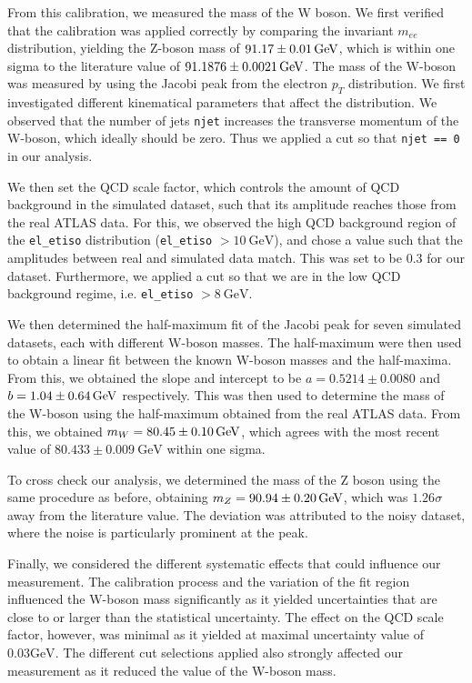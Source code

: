 \documentclass[a4paper]{report}
\numberwithin{equation}{section}
\begin{document}
From this calibration, we measured the mass of the W boson. We first verified that the calibration was applied correctly by 
comparing the invariant $m_{ee}$ distribution, yielding the Z-boson mass of $\SI{91.17 \pm 0.01}{\giga\electronvolt}$, which 
is within one sigma to the literature value of $\SI{91.1876 \pm 0.0021}{\giga\electronvolt}$. The mass of the W-boson was measured by using the Jacobi peak from the 
electron $p_T$ distribution. We first investigated different kinematical parameters that affect the distribution. We observed 
that the number of jets \texttt{njet} increases the transverse momentum of the W-boson, which ideally should be zero. Thus we 
applied a cut so that \texttt{njet == 0} in our analysis.

We then set the QCD scale factor, which controls the amount of QCD background in the simulated 
dataset, such that its amplitude reaches those from the real ATLAS data. For this, we observed the high QCD background 
region of the \texttt{el\_etiso} distribution (\texttt{el\_etiso} $> \SI{10}{\giga\electronvolt}$), and chose a value such that 
the amplitudes between real and simulated data match. This was set to be 0.3 for our dataset. Furthermore, we applied a cut 
so that we are in the low QCD background regime, i.e. \texttt{el\_etiso} $> \SI{8}{\giga\electronvolt}$. \par 

We then determined the half-maximum fit of the Jacobi peak for seven simulated datasets, each with different W-boson masses. 
The half-maximum were then used to obtain a linear fit between the known W-boson masses and the half-maxima. From this, we obtained 
the slope and intercept to be $a = 0.5214 \pm 0.0080$ and $b = \SI{1.04 \pm 0.64}{\giga\electronvolt}$ respectively. This was then 
used to determine the mass of the W-boson using the half-maximum obtained from the real ATLAS data. From this, we obtained 
$m_W = \SI{80.45 \pm 0.10}{\giga\electronvolt}$, which agrees with the most recent value of $80.433 \pm 0.009 \ \text{GeV}$ 
within one sigma. \par 

To cross check our analysis, we determined the mass of the Z boson using the same procedure as before, obtaining 
$m_Z = \SI{90.94 \pm 0.20}{\giga\electronvolt}$, which was $1.26\sigma$ away from the literature value. The deviation was attributed 
to the noisy dataset, where the noise is particularly prominent at the peak. \par 

Finally, we considered the different systematic effects that could influence our measurement. The calibration process and the 
variation of the fit region influenced the W-boson mass significantly as it yielded uncertainties that are close to or larger 
than the statistical uncertainty. The effect on the QCD scale factor, however, was minimal as it yielded at maximal 
uncertainty value of $0.03 \si{\giga\electronvolt}$. The different cut selections applied also strongly affected our measurement 
as it reduced the value of the W-boson mass. \par 
\end{document}

